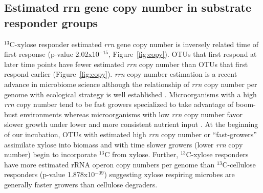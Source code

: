 \subsection{Estimated rrn gene copy number in substrate responder groups}
$^{13}$C-xylose responder estimated \textit{rrn} gene copy number is inversely
related time of first response (p-value 2.02x10$^{-15}$,
Figure~\ref{fig:copy}). OTUs that first respond at later time points have fewer
estimated \textit{rrn} copy number than OTUs that first respond earlier
(Figure~\ref{fig:copy}). \textit{rrn} copy number estimation is a recent
advance in microbiome science \citep{Kembel_2012} although the relationship of
\textit{rrn} copy number per genome with ecological strategy is well
established \citep{Klappenbach_2000}.  Microorganisms with a high \textit{rrn} 
copy number tend to be fast growers specialized to take advantage of boom-bust
environments whereas microorganisms with low \textit{rrn} copy number favor
slower growth under lower and more consistent nutrient input
\citep{Klappenbach_2000}. At the beginning of our incubation, OTUs with
estimated high \textit{rrn} copy number or ``fast-growers''
assimilate xylose into biomass and with time slower growers (lower \textit{rrn} 
copy number) begin to incorporate $^{13}$C from xylose.  Further,
$^{13}$C-xylose responders have more estimated rRNA operon copy numbers per
genome than $^{13}$C-cellulose responders (p-value 1.878x10$^{-09}$) suggesting
xylose respiring microbes are generally faster growers than cellulose
degraders.




